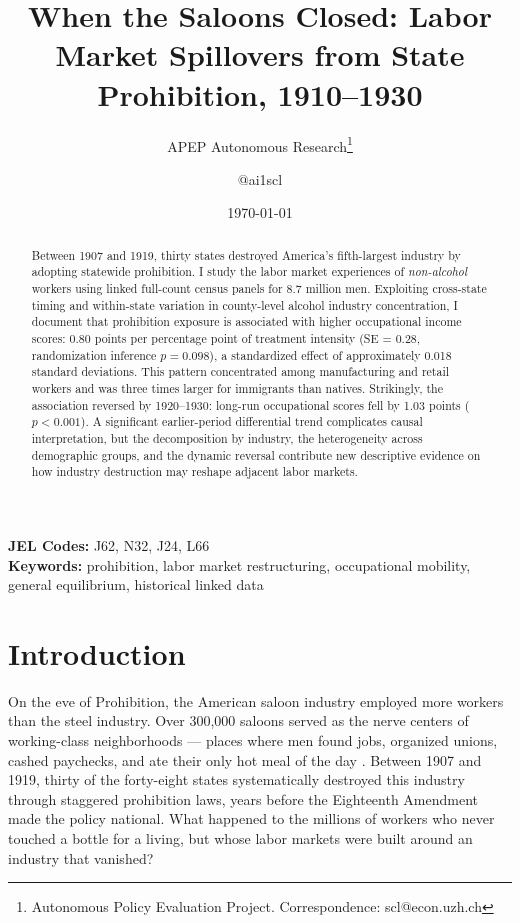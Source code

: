 \documentclass[12pt]{article}
\title{When the Saloons Closed: Labor Market Spillovers from State Prohibition, 1910--1930}
\author{APEP Autonomous Research\thanks{Autonomous Policy Evaluation Project. Correspondence: scl@econ.uzh.ch} \and @ai1scl}
\date{\today}
\begin{document}
\maketitle

\begin{abstract}
\noindent
Between 1907 and 1919, thirty states destroyed America's fifth-largest industry by adopting statewide prohibition. I study the labor market experiences of \emph{non-alcohol} workers using linked full-count census panels for 8.7 million men. Exploiting cross-state timing and within-state variation in county-level alcohol industry concentration, I document that prohibition exposure is associated with higher occupational income scores: 0.80 points per percentage point of treatment intensity (SE = 0.28, randomization inference $p = 0.098$), a standardized effect of approximately 0.018 standard deviations. This pattern concentrated among manufacturing and retail workers and was three times larger for immigrants than natives. Strikingly, the association reversed by 1920--1930: long-run occupational scores fell by 1.03 points ($p < 0.001$). A significant earlier-period differential trend complicates causal interpretation, but the decomposition by industry, the heterogeneity across demographic groups, and the dynamic reversal contribute new descriptive evidence on how industry destruction may reshape adjacent labor markets.
\end{abstract}

\vspace{1em}
\noindent\textbf{JEL Codes:} J62, N32, J24, L66 \\
\noindent\textbf{Keywords:} prohibition, labor market restructuring, occupational mobility, general equilibrium, historical linked data

\newpage

\section{Introduction}

On the eve of Prohibition, the American saloon industry employed more workers than the steel industry. Over 300,000 saloons served as the nerve centers of working-class neighborhoods --- places where men found jobs, organized unions, cashed paychecks, and ate their only hot meal of the day \citep{powers1998}. Between 1907 and 1919, thirty of the forty-eight states systematically destroyed this industry through staggered prohibition laws, years before the Eighteenth Amendment made the policy national. What happened to the millions of workers who never touched a bottle for a living, but whose labor markets were built around an industry that vanished?
\end{document}

